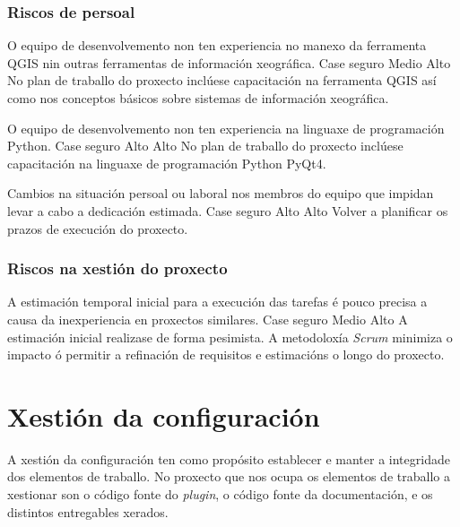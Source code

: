 \subsubsection{Riscos de persoal}
		  	{O equipo de desenvolvemento non ten experiencia no manexo da ferramenta QGIS nin outras ferramentas de información xeográfica.}
			{Case seguro} %
			{Medio} %
			{Alto} %
			{No plan de traballo do proxecto inclúese capacitación na ferramenta QGIS así como nos conceptos básicos sobre sistemas de información xeográfica.}

		  	{O equipo de desenvolvemento non ten experiencia na linguaxe de programación Python.}
			{Case seguro} %
			{Alto} %
			{Alto} %
			{No plan de traballo do proxecto inclúese capacitación na linguaxe de programación Python PyQt4.}
			
		  	{Cambios na situación persoal ou laboral nos membros do equipo que impidan levar a cabo a dedicación estimada.}
			{Case seguro} %
			{Alto} %
			{Alto} %
			{Volver a planificar os prazos de execución do proxecto.}
			
\subsubsection{Riscos na xestión do proxecto}
		  	{A estimación temporal inicial para a execución das tarefas é pouco precisa a causa da inexperiencia en proxectos similares.}
			{Case seguro} %
			{Medio} %
			{Alto} %
			{A estimación inicial realizase de forma pesimista. A metodoloxía \emph{Scrum} minimiza o impacto ó permitir a refinación de requisitos e estimacións o longo do proxecto.}

\section{Xestión da configuración}
A xestión da configuración \cite{GPGC} ten como propósito establecer e manter a integridade dos elementos de traballo. No proxecto que nos ocupa os elementos de traballo a xestionar son o código fonte do \emph{plugin}, o código fonte da documentación, e os distintos entregables xerados.

